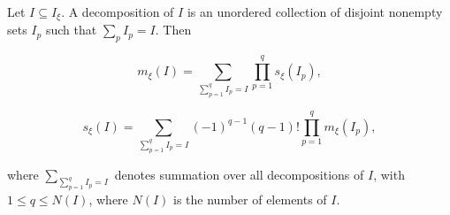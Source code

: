 Let $I \subseteq I_\xi$. A decomposition of $I$ is an unordered collection of disjoint nonempty sets $I_p$ such that $\sum_p I_p = I$. Then

$$m_\xi(I) = \sum_{\sum_{p=1}^q I_p = I} \prod_{p=1}^q s_\xi(I_p),$$

$$s_\xi(I) = \sum_{\sum_{p=1}^q I_p = I} (-1)^{q-1}(q-1)! \prod_{p=1}^q m_\xi(I_p),$$

where $\sum_{\sum_{p=1}^q I_p = I}$ denotes summation over all decompositions of $I$, with $1 \leq q \leq N(I)$, where $N(I)$ is the number of elements of $I$.
